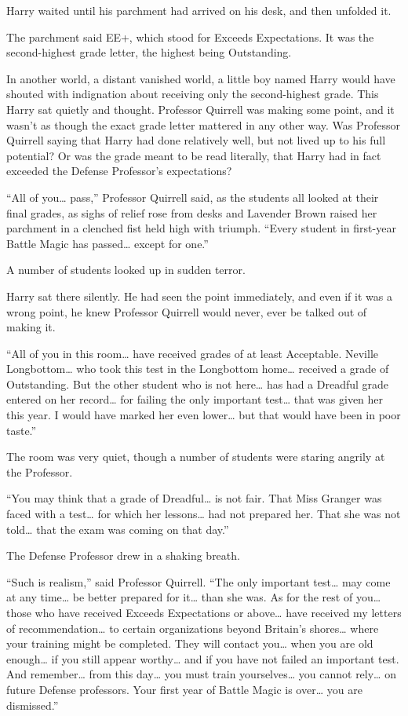 Harry waited until his parchment had arrived on his desk, and then
unfolded it.

The parchment said EE+, which stood for Exceeds Expectations. It was the
second-highest grade letter, the highest being Outstanding.

In another world, a distant vanished world, a little boy named Harry
would have shouted with indignation about receiving only the
second-highest grade. This Harry sat quietly and thought. Professor
Quirrell was making some point, and it wasn't as though the exact grade
letter mattered in any other way. Was Professor Quirrell saying that
Harry had done relatively well, but not lived up to his full potential?
Or was the grade meant to be read literally, that Harry had in fact
exceeded the Defense Professor's expectations?

``All of you\ldots{} pass,'' Professor Quirrell said, as the students
all looked at their final grades, as sighs of relief rose from desks and
Lavender Brown raised her parchment in a clenched fist held high with
triumph. ``Every student in first-year Battle Magic has passed\ldots{}
except for one.''

A number of students looked up in sudden terror.

Harry sat there silently. He had seen the point immediately, and even if
it was a wrong point, he knew Professor Quirrell would never, ever be
talked out of making it.

``All of you in this room\ldots{} have received grades of at least
Acceptable. Neville Longbottom\ldots{} who took this test in the
Longbottom home\ldots{} received a grade of Outstanding. But the other
student who is not here\ldots{} has had a Dreadful grade entered on her
record\ldots{} for failing the only important test\ldots{} that was
given her this year. I would have marked her even lower\ldots{} but that
would have been in poor taste.''

The room was very quiet, though a number of students were staring
angrily at the Professor.

``You may think that a grade of Dreadful\ldots{} is not fair. That Miss
Granger was faced with a test\ldots{} for which her lessons\ldots{} had
not prepared her. That she was not told\ldots{} that the exam was coming
on that day.''

The Defense Professor drew in a shaking breath.

``Such is realism,'' said Professor Quirrell. ``The only important
test\ldots{} may come at any time\ldots{} be better prepared for
it\ldots{} than she was. As for the rest of you\ldots{} those who have
received Exceeds Expectations or above\ldots{} have received my letters
of recommendation\ldots{} to certain organizations beyond Britain's
shores\ldots{} where your training might be completed. They will contact
you\ldots{} when you are old enough\ldots{} if you still appear
worthy\ldots{} and if you have not failed an important test. And
remember\ldots{} from this day\ldots{} you must train yourselves\ldots{}
you cannot rely\ldots{} on future Defense professors. Your first year of
Battle Magic is over\ldots{} you are dismissed.''

